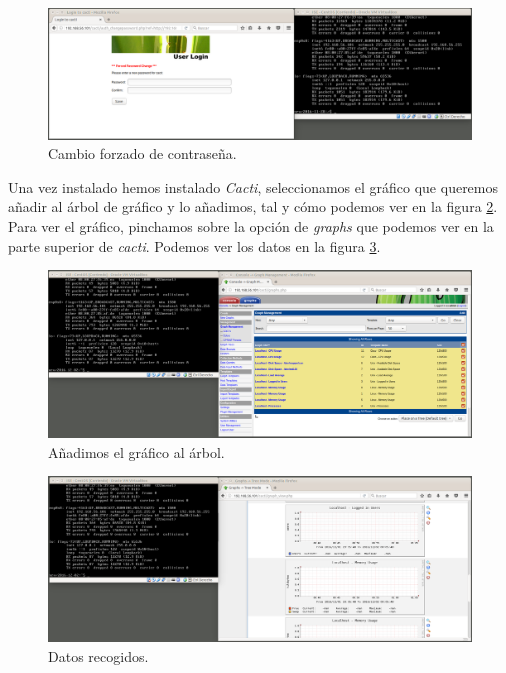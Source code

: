 \documentclass[a4paper,titlepage,12pt]{report}	%
\numberwithin{figure}{section} %
\numberwithin{table}{section} %
\begin{document}
	\begin{figure}[H]
	   \includegraphics[width=\linewidth]{./Imagenes/P3/O5-11.png}
	   \vspace{-0.5cm}
	   \caption[Cambio forzado de contraseña.]{Cambio forzado de contraseña.}
	   \label{P3-O5-11}
	\end{figure}

	Una vez instalado hemos instalado \textit{Cacti}, seleccionamos el gráfico que queremos añadir al árbol de gráfico y lo añadimos, tal y cómo podemos ver en la figura \ref{P3-O5-12}. Para ver el gráfico, pinchamos sobre la opción de \textit{graphs} que podemos ver en la parte superior de \textit{cacti}. Podemos ver los datos en la figura \ref{P3-O5-13}.

	\begin{figure}[H]
	   \includegraphics[width=\linewidth]{./Imagenes/P3/O5-12.png}
	   \vspace{-0.5cm}
	   \caption[Añadimos el gráfico al árbol.]{Añadimos el gráfico al árbol.}
	   \label{P3-O5-12}
	\end{figure}

	\begin{figure}[H]
	   \includegraphics[width=\linewidth]{./Imagenes/P3/O5-13.png}
	   \vspace{-0.5cm}
	   \caption[Datos recogidos.]{Datos recogidos.}
	   \label{P3-O5-13}
	\end{figure}
\end{document}
